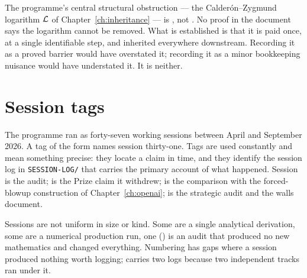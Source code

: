 \begin{obsv}
\label{obs:open-is-honest}
The programme's central structural obstruction --- the Calder\'on--Zygmund
logarithm \(\mathcal{L}\) of Chapter~\ref{ch:inheritance} --- is \OPEN{}, not
\IMPOSSIBLE{}. No proof in the document says the logarithm cannot be removed.
What is established is that it is paid once, at a single identifiable step,
and inherited everywhere downstream. Recording it as a proved barrier would
have overstated it; recording it as a minor bookkeeping nuisance would have
understated it. It is neither.
\end{obsv}

\section{Session tags}
\label{sec:session-tags}

The programme ran as forty-seven working sessions between April and September
2026. A tag of the form  names session thirty-one. Tags are used
constantly and mean something precise: they locate a claim in time, and they
identify the session log in \texttt{SESSION-LOG/} that carries the primary
account of what happened. Session  is the audit;  is the Prize
claim it withdrew;  is the comparison with the forced-blowup
construction of Chapter~\ref{ch:openai};  is the strategic audit and
 the walls document.

Sessions are not uniform in size or kind. Some are a single analytical
derivation, some are a numerical production run, one () is an audit
that produced no new mathematics and changed everything. Numbering has gaps
where a session produced nothing worth logging;  carries two logs
because two independent tracks ran under it.

